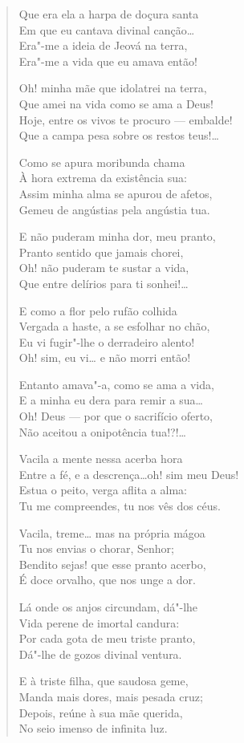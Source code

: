 \begin{verse}
Que era ela a harpa de doçura santa\\
Em que eu cantava divinal canção\ldots{}\\
Era"-me a ideia de Jeová na terra,\\
Era"-me a vida que eu amava então!

Oh! minha mãe que idolatrei na terra,\\
Que amei na vida como se ama a Deus!\\
Hoje, entre os vivos te procuro --- embalde!\\
Que a campa pesa sobre os restos teus!\ldots{}

Como se apura moribunda chama\\
À hora extrema da existência sua:\\
Assim minha alma se apurou de afetos,\\
Gemeu de angústias pela angústia tua.

E não puderam minha dor, meu pranto,\\
Pranto sentido que jamais chorei,\\
Oh! não puderam te sustar a vida,\\
Que entre delírios para ti sonhei!\ldots{}

E como a flor pelo rufão colhida\\
Vergada a haste, a se esfolhar no chão,\\
Eu vi fugir"-lhe o derradeiro alento!\\
Oh! sim, eu vi\ldots{} e não morri então!

Entanto amava"-a, como se ama a vida,\\
E a minha eu dera para remir a sua\ldots{}\\
Oh! Deus --- por que o sacrifício oferto,\\
Não aceitou a onipotência tua!?!\ldots{}

Vacila a mente nessa acerba hora\\
Entre a fé, e a descrença\ldots{}oh! sim meu Deus!\\
Estua o peito, verga aflita a alma:\\
Tu me compreendes, tu nos vês dos céus.

Vacila, treme\ldots{} mas na própria mágoa\\
Tu nos envias o chorar, Senhor;\\
Bendito sejas! que esse pranto acerbo,\\
É doce orvalho, que nos unge a dor.

Lá onde os anjos circundam, dá"-lhe\\
Vida perene de imortal candura:\\
Por cada gota de meu triste pranto,\\
Dá"-lhe de gozos divinal ventura.

E à triste filha, que saudosa geme,\\
Manda mais dores, mais pesada cruz;\\
Depois, reúne à sua mãe querida,\\
No seio imenso de infinita luz.
\end{verse}

